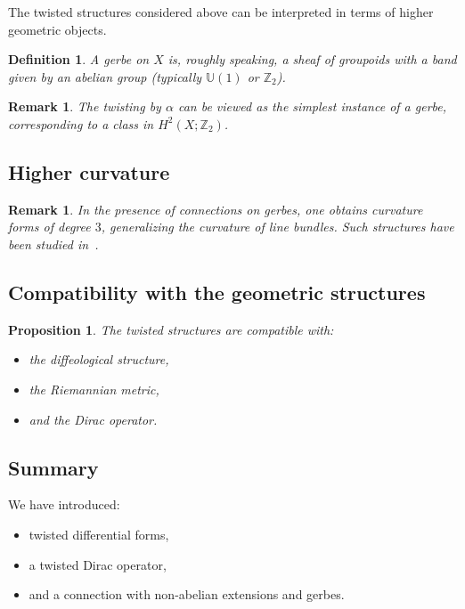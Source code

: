 \documentclass[11pt]{amsart}
\newtheorem{proposition}[theorem]{Proposition}
\newtheorem{definition}[theorem]{Definition}
\newtheorem{remark}[theorem]{Remark}
\begin{document}
The twisted structures considered above can be interpreted in terms of higher geometric objects.

\begin{definition}
A gerbe on $X$ is, roughly speaking, a sheaf of groupoids with a band given by an abelian group (typically $\mathbb{U}(1)$ or $\mathbb{Z}_2$).
\end{definition}

\begin{remark}
The twisting by $\alpha$ can be viewed as the simplest instance of a gerbe, corresponding to a class in $H^2(X;\mathbb{Z}_2)$.
\end{remark}

\subsection{Higher curvature}

\begin{remark}
In the presence of connections on gerbes, one obtains curvature forms of degree $3$, generalizing the curvature of line bundles. Such structures have been studied in~\cite{BreenMessing2005}.
\end{remark}

\subsection{Compatibility with the geometric structures}

\begin{proposition}
The twisted structures are compatible with:
\begin{itemize}
\item the diffeological structure,
\item the Riemannian metric,
\item and the Dirac operator.
\end{itemize}
\end{proposition}

\subsection{Summary}

We have introduced:
\begin{itemize}
\item twisted differential forms,
\item a twisted Dirac operator,
\item and a connection with non-abelian extensions and gerbes.
\end{itemize}
\end{document}

